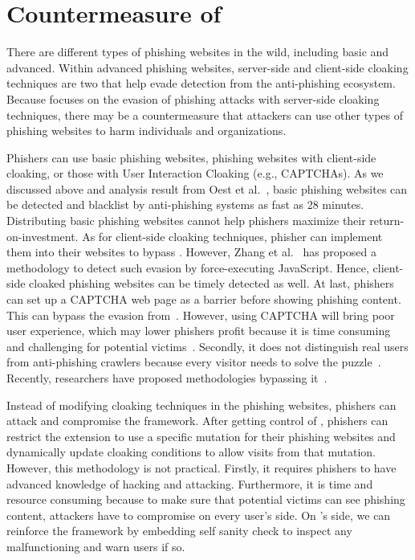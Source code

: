 \section{Countermeasure of \spartacus}


There are different types of phishing websites in the wild, including basic and advanced.
Within advanced phishing websites, server-side and client-side cloaking techniques are two that help evade detection from the anti-phishing ecosystem.
Because \spartacus focuses on the evasion of phishing attacks with server-side cloaking techniques,
there may be a countermeasure that attackers can use other types of phishing websites to harm individuals and organizations.

Phishers can use basic phishing websites, phishing websites with client-side cloaking, or those with User Interaction Cloaking (e.g., CAPTCHAs).
As we discussed above and analysis result from Oest et al.~\cite{oest2020phishtime}, basic phishing websites can be detected and blacklist by anti-phishing systems as fast as 28 minutes.
Distributing basic phishing websites cannot help phishers maximize their return-on-investment.
As for client-side cloaking techniques,
phisher can implement them into their websites to bypass \spartacus.
However, Zhang et al.~\cite{zhang2021crawlphish} has proposed a methodology to detect such evasion by force-executing JavaScript.
Hence, client-side cloaked phishing websites can be timely detected as well.
At last, phishers can set up a CAPTCHA web page as a barrier before showing phishing content.
This can bypass the evasion from~\spartacus.
However, using CAPTCHA will bring poor user experience, which may lower phishers profit because it is time consuming and challenging for potential victims~\cite{captcha}.
Secondly, it does not distinguish real users from anti-phishing crawlers because every visitor needs to solve the puzzle~\cite{captcha}.
Recently, researchers have proposed methodologies bypassing it~\cite{sivakorn2016m,stark2015captcha, zhang2021crawlphish}.

Instead of modifying cloaking techniques in the phishing websites,
phishers can attack and compromise the \spartacus framework.
After getting control of \spartacus, phishers can restrict the extension to use a specific mutation for their phishing websites and dynamically update cloaking conditions to allow visits from that mutation.
However, this methodology is not practical.
Firstly, it requires phishers to have advanced knowledge of hacking and attacking.
Furthermore, it is time and resource consuming because to make sure that potential victims can see phishing content, attackers have to compromise \spartacus on every user's side.
On \spartacus's side, we can reinforce the framework by embedding self sanity check to inspect any malfunctioning and warn users if so.

